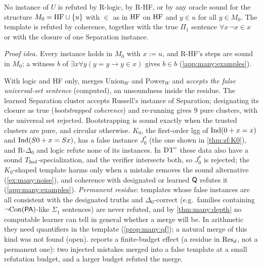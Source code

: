 \begin{proposition}\label{prop:many:univset}
No instance of $U$ is refuted by R-logic, by R-HF, or by any oracle sound for the structure $M_0=\mathrm{HF}\cup\{u\}$ with $\in$ as
in $\mathrm{HF}$ on $\mathrm{HF}$ and $y\in u$ for all $y\in M_0$. The template is refuted by coherence, together with the true $\Pi_1$
sentence $\forall x\,\neg x\in x$ or with the closure of one Separation instance.
\end{proposition}
\noindent\emph{Proof idea.} Every instance holds in $M_0$ with $x:=u$, and R-HF's steps are sound in $M_0$; a witness $b$
of $\exists x\forall y(y=y\to y\in x)$ gives $b\in b$ (\cref{app:many:examples}).\medskip

With logic and HF only, \DTRC{} merges $\mathrm{Union}_W$ and $\mathrm{Power}_W$ and \emph{accepts the false
universal-set sentence} (computed), an unsoundness inside the residue. The learned Separation cluster accepts Russell's
instance of Separation; designating its closure as true (\emph{bootstrapped coherence}) and re-running gives 9 pure
clusters, with the universal set rejected. Bootstrapping is sound exactly when the trusted clusters are pure, and circular
otherwise. \emph{$K_0$}, the first-order lgg of $\mathrm{Ind}(0+x=x)$ and $\mathrm{Ind}(S0+x=Sx)$, has a false instance
$J^*_0$ (the one shown in \cref{thm:zf:K0}), and R-$\Delta_0$ and logic refute none of its instances. In $\mathrm{DT}^{\circ}$ these data
also have a sound $T_{\mathrm{Ind}}$-specialization, and the verifier intersects both, so $J^*_0$ is rejected; the $K_0$-shaped template harms only when a mistake removes the sound alternative
(\cref{ex:many:noise}), and coherence with designated or learned $\mathsf{Q}$ refutes it (\cref{app:many:examples}).
\emph{Permanent residue}: templates whose false instances are all consistent with the designated truths and $\Delta_0$-correct (e.g.\ families containing $\neg\mathrm{Con}(\mathsf{PA})$-like
$\Sigma_1$ sentences) are never refuted, and by \cref{thm:many:depth} no computable learner can tell in general whether a
merge will be. In arithmetic they need quantifiers in the template (\cref{prop:many:qf}); a natural merge of this kind was
not found (open).  reports a finite-budget effect (a residue in $\mathrm{Res}_d$, not a permanent one): two
injected mistakes merged into a false template at a small refutation budget, and a larger budget refuted the merge.

